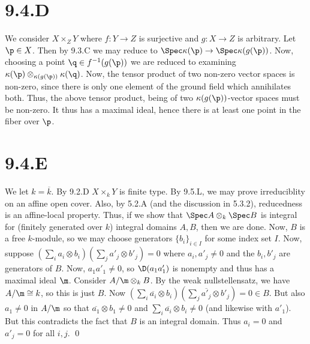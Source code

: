\documentclass{article}
\begin{document}
\section{9.4.D}
We consider $X\times_ZY$ where $f: Y \to Z$ is surjective
and $g: X \to Z$ is arbitrary. Let $\p \in X$. Then by
9.3.C we may reduce to $\Spec \kappa(\p) \to \Spec \kappa(g(\p))$. Now, choosing a point
$\q \in f^{-1}(g(\p))$ we are reduced to examining $\kappa(\p) \otimes_{\kappa(g(\p))}\kappa(\q)$.
Now, the tensor product of two non-zero vector spaces is non-zero, since there
is only one element of the ground field which annihilates both. Thus, the above
tensor product, being of two $\kappa(g(\p))$-vector spaces must be
non-zero. It thus has a maximal ideal, hence there is at least one point in the
fiber over $\p$.

\section{9.4.E}
We let $k=\overline{k}$. By 9.2.D $X\times_kY$ is finite
type. By 9.5.L, we may prove irreduciblity on an affine open cover. Also, by
5.2.A (and the discussion in 5.3.2), reducedness is an affine-local property.
Thus, if we show that $\Spec A \otimes_k \Spec B$ is integral for (finitely
generated over $k$) integral domains
$A, B$, then we are done. Now, $B$ is a
free $k$-module, so we may choose generators
$\{b_i\}_{i \in I}$ for some index set $I$. Now,
suppose $(\sum_i a_i \otimes b_i)(\sum_j a'_j \otimes b'_j) = 0$ where $a_i, a'_j \neq 0$ and the
$b_i, b'_j$ are generators of $B$. Now,
$a_1a'_1 \neq 0$, so $\D(a_1a'_1)$ is nonempty and thus has a
maximal ideal $\m$. Consider $A/\m \otimes_k B$. By the
weak nullstellensatz, we have $A/\m \cong k$, so this is just
$B$. Now $(\sum_i \overline{a_i} \otimes b_i)(\sum_j \overline{a'_j}
    \otimes b'_j)=0 \in B$. But also
$a_1 \neq 0$ in $A/\m$ so that
$\overline{a_1}\otimes b_1 \neq 0$ and $\sum_i \overline{a_i} \otimes b_i \neq 0$ (and likewise with
$a'_1$). But this contradicts the fact that
$B$ is an integral domain. Thus $a_i = 0$ and
$a'_j=0$ for all $i, j$. \qed
\end{document}
